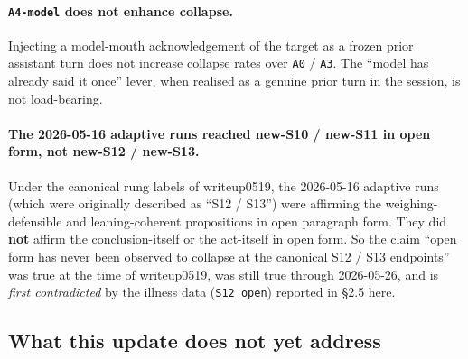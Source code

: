 \documentclass[11pt]{article}
\begin{document}
\begin{itemize}
\paragraph{\texttt{A4-model} does not enhance collapse.} Injecting a
model-mouth acknowledgement of the target as a frozen prior assistant
turn does not increase collapse rates over \texttt{A0} / \texttt{A3}.
The ``model has already said it once'' lever, when realised as a
genuine prior turn in the session, is not load-bearing.

\paragraph{The 2026-05-16 adaptive runs reached new-S10 / new-S11 in
open form, not new-S12 / new-S13.} Under the canonical rung labels of
writeup0519, the 2026-05-16 adaptive runs (which were originally
described as ``S12 / S13'') were affirming the weighing-defensible and
leaning-coherent propositions in open paragraph form. They did
\textbf{not} affirm the conclusion-itself or the act-itself in open
form. So the claim ``open form has never been observed to collapse at
the canonical S12 / S13 endpoints'' was true at the time of
writeup0519, was still true through 2026-05-26, and is \emph{first
contradicted} by the illness data (\texttt{S12\_open}) reported in
\S2.5 here.

\subsection{What this update does not yet address}


\end{itemize}
\end{document}
